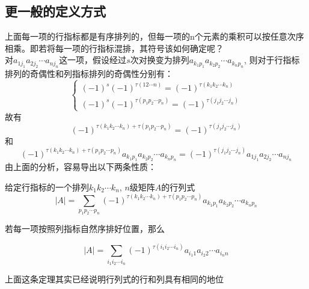 \subsection{更一般的定义方式}
上面每一项的行指标都是有序排列的，但每一项的n个元素的乘积可以按任意次序相乘。即若将每一项的行指标混排，其符号该如何确定呢？\\
对$a_{1j_{1}}a_{2j_{2}}\cdots a_{nj_{n}}$这一项，假设经过$s$次对换变为排列$a_{k_{1}p_{1}}a_{k_{2}p_{2}}\cdots a_{k_{n}p_{n}}$,
则对于行指标排列的奇偶性和列指标排列的奇偶性分别有：
\begin{equation*}
    \begin{cases}
        (-1)^{s} (-1)^{\tau(12 \cdots n)} = (-1)^{\tau (k_{1}k_{2}\cdots k_{n})} \\
        (-1)^{s} (-1)^{\tau (p_{1}p_{2}\cdots p_{n})} = (-1)^{\tau (j_{1}j_{2}\cdots j_{n})}
    \end{cases}
\end{equation*}
故有
\begin{equation*}
    (-1)^{\tau (k_{1}k_{2}\cdots k_{n}) + \tau (p_{1}p_{2}\cdots p_{n})} = (-1)^{\tau (j_{1}j_{2}\cdots j_{n})}
\end{equation*}
和
\begin{equation*}
    (-1)^{\tau (k_{1}k_{2}\cdots k_{n}) + \tau (p_{1}p_{2}\cdots p_{n})} a_{k_{1}p_{1}}a_{k_{2}p_{2}}\cdots a_{k_{n}p_{n}} 
    =
    (-1)^{\tau (j_{1}j_{2}\cdots j_{n})} a_{1j_{1}}a_{2j_{2}}\cdots a_{nj_{n}}
\end{equation*}
由上面的分析，容易导出以下两条性质：
\begin{theorem}[行列式的一般定义]
    给定行指标的一个排列$k_{1}k_{2}\cdots k_{n}$, $n$级矩阵$A$的行列式
    \begin{equation*}
        |A| = \sum _{p_{1}p_{2}\cdots p_{n}} ^{} (-1)^{\tau (k_{1}k_{2}\cdots k_{n}) + \tau (p_{1}p_{2}\cdots p_{n})} a_{k_{1}p_{1}}a_{k_{2}p_{2}}\cdots a_{k_{n}p_{n}}
    \end{equation*}
\end{theorem}

若每一项按照列指标自然序排好位置，那么
\begin{theorem}
    \begin{equation*}
        |A| = \sum_{i_{1}i_{2}\cdots i_{n}}^{} (-1)^{\tau (i_{1}i_{2}\cdots i_{n})} 
        a_{i_{1}1}a_{i_{2}2}\cdots a_{i_{n}n}
    \end{equation*}
\end{theorem}
\begin{remark}
    上面这条定理其实已经说明行列式的行和列具有相同的地位
\end{remark}

